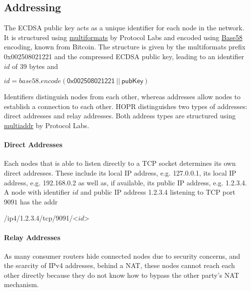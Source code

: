\subsection{Addressing}

The ECDSA public key acts as a unique identifier for each node in the network. It is structured using \href{https://github.com/multiformats/multiformats}{multiformats} by Protocol Labs and encoded using \href{https://en.bitcoin.it/wiki/Base58Check_encoding}{Base58} encoding, known from Bitcoin. The structure is given by the multiformats prefix \textsf{0x002508021221} and the compressed ECDSA public key, leading to an identifier $id$ of 39 bytes and

\begin{center}
    $id = base58.encode(\mathsf{0x002508021221} \ || \ \mathsf{pubKey})$
\end{center}

Identifiers distinguish nodes from each other, whereas addresses allow nodes to establish a connection to each other. HOPR distinguishes two types of addresses: direct addresses and relay addresses. Both address types are structured using \href{https://github.com/multiformats/multiaddr}{multiaddr} by Protocol Labs.

\paragraph{Direct Addresses}

Each nodes that is able to listen directly to a TCP socket determines its own direct addresses. These include its local IP address, e.g. \textsf{127.0.0.1}, its local IP address, e.g. \textsf{192.168.0.2} as well as, if available, its public IP address, e.g. \textsf{1.2.3.4}. A node with identifier $id$ and public IP address \textsf{1.2.3.4} listening to TCP port $9091$ has the addr

\begin{center}
    \textsf{/ip4/1.2.3.4/tcp/9091/}\textless$id$\textgreater{}
\end{center}

\paragraph{Relay Addresses}

As many consumer routers hide connected nodes due to security concerns, and the scarcity of IPv4 addresses, behind a NAT, these nodes cannot reach each other directly because they do not know how to bypass the other party's NAT mechanism.

